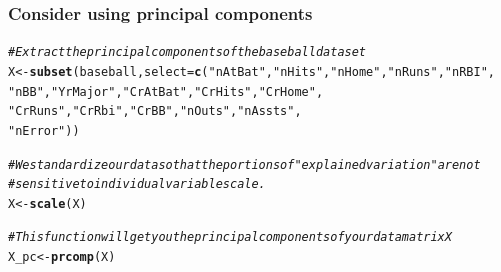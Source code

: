 \documentclass{article}\usepackage[]{graphicx}\usepackage[]{color}
\makeatletter
\newcommand{\hlstr}[1]{\textcolor[rgb]{0.192,0.494,0.8}{#1}}%
\newcommand{\hlcom}[1]{\textcolor[rgb]{0.678,0.584,0.686}{\textit{#1}}}%
\newcommand{\hlstd}[1]{\textcolor[rgb]{0.345,0.345,0.345}{#1}}%
\newcommand{\hlkwb}[1]{\textcolor[rgb]{0.69,0.353,0.396}{#1}}%
\newcommand{\hlkwc}[1]{\textcolor[rgb]{0.333,0.667,0.333}{#1}}%
\newcommand{\hlkwd}[1]{\textcolor[rgb]{0.737,0.353,0.396}{\textbf{#1}}}%
\newenvironment{kframe}{%
 \def\at@end@of@kframe{}%
 \ifinner\ifhmode%
  \def\at@end@of@kframe{\end{minipage}}%
  \begin{minipage}{\columnwidth}%
 \fi\fi%
 \def\FrameCommand##1{\hskip\@totalleftmargin \hskip-\fboxsep
 \colorbox{shadecolor}{##1}\hskip-\fboxsep
     \hskip-\linewidth \hskip-\@totalleftmargin \hskip\columnwidth}%
 \MakeFramed {\advance\hsize-\width
   \@totalleftmargin\z@ \linewidth\hsize
   \@setminipage}}%
 {\par\unskip\endMakeFramed%
 \at@end@of@kframe}
\newenvironment{knitrout}{}{} %
\makeatother
\begin{document}
\subsubsection*{Consider using principal components}

\begin{knitrout}
\color{fgcolor}\begin{kframe}
\begin{alltt}
\hlcom{# Extract the principal components of the baseball dataset}
\hlstd{X} \hlkwb{<-} \hlkwd{subset}\hlstd{(baseball,} \hlkwc{select} \hlstd{=} \hlkwd{c}\hlstd{(}\hlstr{"nAtBat"}\hlstd{,} \hlstr{"nHits"}\hlstd{,} \hlstr{"nHome"}\hlstd{,} \hlstr{"nRuns"}\hlstd{,} \hlstr{"nRBI"}\hlstd{,}
                                 \hlstr{"nBB"}\hlstd{,} \hlstr{"YrMajor"}\hlstd{,} \hlstr{"CrAtBat"}\hlstd{,} \hlstr{"CrHits"}\hlstd{,} \hlstr{"CrHome"}\hlstd{,}
                                 \hlstr{"CrRuns"}\hlstd{,} \hlstr{"CrRbi"}\hlstd{,} \hlstr{"CrBB"}\hlstd{,} \hlstr{"nOuts"}\hlstd{,} \hlstr{"nAssts"}\hlstd{,}
                                 \hlstr{"nError"}\hlstd{))}

\hlcom{# We standardize our data so that the portions of "explained variation" are not}
\hlcom{# sensitive to individual variable scale.}
\hlstd{X} \hlkwb{<-} \hlkwd{scale}\hlstd{(X)}

\hlcom{# This function will get you the principal components of your data matrix X}
\hlstd{X_pc} \hlkwb{<-} \hlkwd{prcomp}\hlstd{(X)}


\end{alltt}
\end{kframe}
\end{knitrout}
\end{document}
